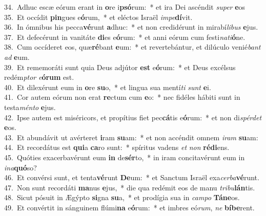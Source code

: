 {34.~}Adhuc escæ eórum erant in \textbf{o}re i\textbf{psó}rum:~* et ira Dei ascéndit \textit{su}\textit{per} \textbf{e}os\\
{35.~}Et occídit \textbf{pin}gues e\textbf{ó}rum,~* et eléctos Israël \textit{im}\textit{pe}\textbf{dí}vit.\\
{36.~}In ómnibus his pecca\textbf{vé}runt \textbf{a}dhuc:~* et non credidérunt in mirabí\textit{li}\textit{bus} \textbf{e}jus.\\
{37.~}Et defecérunt in vanitáte \textbf{di}es e\textbf{ó}rum:~* et anni eórum cum festi\textit{na}\textit{ti}\textbf{ó}ne.\\
{38.~}Cum occíderet eos, quæ\textbf{ré}bant \textbf{e}um:~* et revertebántur, et dilúculo venié\textit{bant} \textit{ad} \textbf{e}um.\\
{39.~}Et rememoráti sunt quia Deus adjútor \textbf{est} e\textbf{ó}rum:~* et Deus excélsus redém\textit{ptor} \textit{e}\textbf{ó}\textbf{rum} est.\\
{40.~}Et dilexérunt eum in \textbf{o}re \textbf{su}o,~* et lingua sua mentí\textit{ti} \textit{sunt} \textbf{e}i.\\
{41.~}Cor autem eórum non erat \textbf{re}ctum cum \textbf{e}o:~* nec fidéles hábiti sunt in testa\textit{mén}\textit{to} \textbf{e}jus.\\
{42.~}Ipse autem est miséricors, et propítius fiet pec\textbf{cá}tis e\textbf{ó}rum:~* et non di\textit{spér}\textit{det} \textbf{e}os.\\
{43.~}Et abundávit ut avérteret \textbf{i}ram \textbf{su}am:~* et non accéndit omnem \textit{i}\textit{ram} \textbf{su}am:\\
{44.~}Et recordátus est \textbf{qui}a \textbf{ca}ro sunt:~* spíritus vadens \textit{et} \textit{non} \textbf{ré}\textbf{di}ens.\\
{45.~}Quóties exacerbavérunt eum \textbf{in} de\textbf{sér}to,~* in iram concitavérunt eum in \textit{i}\textit{na}\textbf{quó}so?\\
{46.~}Et convérsi sunt, et tenta\textbf{vé}runt \textbf{De}um:~* et Sanctum Israël exa\textit{cer}\textit{ba}\textbf{vé}runt.\\
{47.~}Non sunt recordáti \textbf{ma}nus \textbf{e}jus,~* die qua redémit eos de manu \textit{tri}\textit{bu}\textbf{lán}tis.\\
{48.~}Sicut pósuit in Ægýpto \textbf{si}gna \textbf{su}a,~* et prodígia sua in \textit{cam}\textit{po} \textbf{Tá}\textbf{ne}os.\\
{49.~}Et convértit in sánguinem flúmi\textbf{na} e\textbf{ó}rum:~* et imbres eó\textit{rum}, \textit{ne} \textbf{bí}\textbf{be}rent.\\
